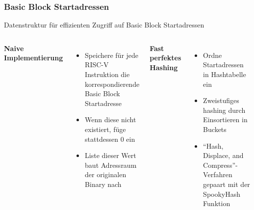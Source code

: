 
\begin{frame}
    \frametitle{Basic Block Startadressen}{Datenstruktur für effizienten Zugriff auf Basic Block Startadressen}
    \vspace{1cm}
    \begin{columns}[t]
        \textbf{Naive Implementierung}
        \begin{itemize}
            \vspace{1em}
            \setlength{\itemsep}{1em}
            \item Speichere für jede RISC-V Instruktion die korrespondierende Basic Block Startadresse
            \item Wenn diese nicht existiert, füge stattdessen 0 ein
            \item Liste dieser Wert baut Adressraum der originalen Binary nach
        \end{itemize}
        \textbf{Fast perfektes Hashing}
        \begin{itemize}
            \vspace{1em}
            \setlength{\itemsep}{1em}
            \item Ordne Startadressen in Hashtabelle ein
            \item Zweistufiges hashing durch Einsortieren in Buckets
            \item ``Hash, Displace, and Compress''-Verfahren gepaart mit der SpookyHash Funktion
        \end{itemize}
    \end{columns}
\end{frame}
\clearpage

